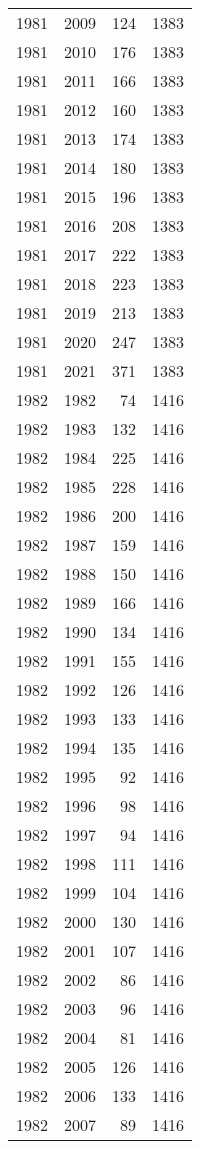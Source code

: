 \documentclass[
  10pt,
  letterpaper,
  DIV=11,
  numbers=noendperiod,
  twoside]{scrartcl}
\begin{document}
\begin{longtable}[]{@{}rrrr@{}}
1981 & 2009 & 124 & 1383 \\
1981 & 2010 & 176 & 1383 \\
1981 & 2011 & 166 & 1383 \\
1981 & 2012 & 160 & 1383 \\
1981 & 2013 & 174 & 1383 \\
1981 & 2014 & 180 & 1383 \\
1981 & 2015 & 196 & 1383 \\
1981 & 2016 & 208 & 1383 \\
1981 & 2017 & 222 & 1383 \\
1981 & 2018 & 223 & 1383 \\
1981 & 2019 & 213 & 1383 \\
1981 & 2020 & 247 & 1383 \\
1981 & 2021 & 371 & 1383 \\
1982 & 1982 & 74 & 1416 \\
1982 & 1983 & 132 & 1416 \\
1982 & 1984 & 225 & 1416 \\
1982 & 1985 & 228 & 1416 \\
1982 & 1986 & 200 & 1416 \\
1982 & 1987 & 159 & 1416 \\
1982 & 1988 & 150 & 1416 \\
1982 & 1989 & 166 & 1416 \\
1982 & 1990 & 134 & 1416 \\
1982 & 1991 & 155 & 1416 \\
1982 & 1992 & 126 & 1416 \\
1982 & 1993 & 133 & 1416 \\
1982 & 1994 & 135 & 1416 \\
1982 & 1995 & 92 & 1416 \\
1982 & 1996 & 98 & 1416 \\
1982 & 1997 & 94 & 1416 \\
1982 & 1998 & 111 & 1416 \\
1982 & 1999 & 104 & 1416 \\
1982 & 2000 & 130 & 1416 \\
1982 & 2001 & 107 & 1416 \\
1982 & 2002 & 86 & 1416 \\
1982 & 2003 & 96 & 1416 \\
1982 & 2004 & 81 & 1416 \\
1982 & 2005 & 126 & 1416 \\
1982 & 2006 & 133 & 1416 \\
1982 & 2007 & 89 & 1416 \\

\end{longtable}
\end{document}
